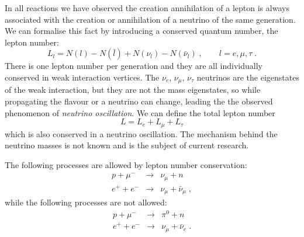 \documentclass[12pt]{article}
\begin{document}
In all reactions we have observed the creation annihilation of a lepton is always associated with the creation or annihilation of a neutrino of the same generation. We can formalise this fact by introducing a conserved quantum number, the lepton number:
\[L_l=N(l)-N(\bar l)+N(\nu_l)-N(\bar \nu_l)\;,\qquad l=e,\mu,\tau\;.\]
There is one lepton number per generation and they are all individually conserved in weak interaction vertices. The $\nu_e$, $\nu_\mu$, $\nu_\tau$ neutrinos are the eigenstates of the weak interaction, but they are not the mass eigenstates, so while propagating the flavour or a neutrino can change, leading the the observed phenomenon of \emph{neutrino oscillation}. We can define the total lepton number
\[L=L_e+L_\mu+L_\tau\]
which is also conserved in a neutrino oscillation. The mechanism behind the neutrino masses is not known and is the subject of current research.

The following processes are allowed by lepton number conservation:
\begin{eqnarray*}
p+\mu^-  &\rightarrow & \nu_\mu+n \\
e^++e^-  &\rightarrow & \nu_\mu+\bar \nu_\mu \;,  
\end{eqnarray*}
while the following processes are not allowed:
\begin{eqnarray*}
p+\mu^-  &\rightarrow & \pi^0 + n \\
e^++e^-  &\rightarrow & \nu_\mu+\bar \nu_e \;.
\end{eqnarray*}
%
%
\end{document}
